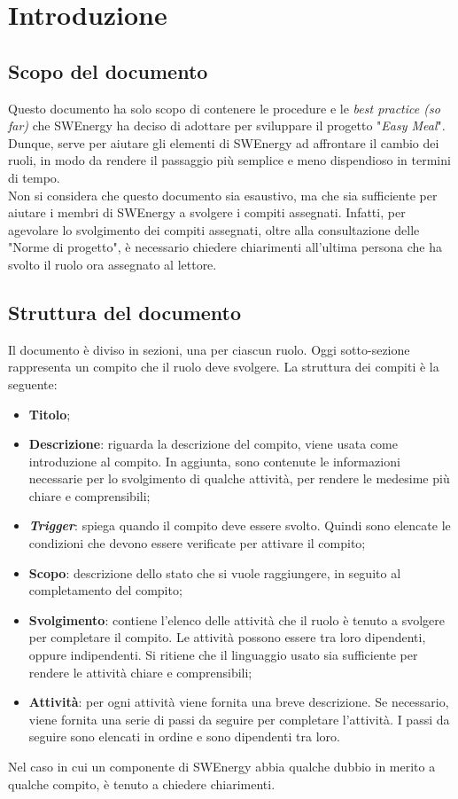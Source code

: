 \section{Introduzione}
\subsection{Scopo del documento}

Questo documento ha solo scopo di contenere le procedure e le \textit{best
	practice (so far)} che SWEnergy ha deciso di adottare per sviluppare il
progetto "\textit{Easy Meal}".
Dunque, serve per aiutare gli elementi di SWEnergy ad affrontare il cambio
dei ruoli, in modo da rendere il passaggio più semplice e meno dispendioso in
termini di tempo.\\
Non si considera che questo documento sia esaustivo, ma che sia sufficiente per
aiutare i membri di SWEnergy a svolgere i compiti assegnati. Infatti, per
agevolare lo svolgimento dei compiti assegnati, oltre alla consultazione delle
"Norme di progetto", è necessario chiedere chiarimenti all'ultima persona che ha
svolto il ruolo ora assegnato al lettore.


\subsection{Struttura del documento}

Il documento è diviso in sezioni, una per ciascun ruolo. Oggi sotto-sezione
rappresenta un compito che il ruolo deve svolgere. La struttura dei compiti è la
seguente:
\begin{itemize}
	\item \textbf{Titolo};

	\item \textbf{Descrizione}: riguarda la descrizione del compito, viene usata
	      come introduzione al compito. In aggiunta, sono contenute le
	      informazioni necessarie per lo svolgimento di qualche attività, per
	      rendere le medesime più chiare e comprensibili;

	\item \textbf{\textit{Trigger}}: spiega quando il compito deve essere
	      svolto. Quindi sono elencate le condizioni che devono essere
	      verificate per attivare il compito;

	\item \textbf{Scopo}: descrizione dello stato che si vuole raggiungere, in
	      seguito al completamento del compito;

	\item \textbf{Svolgimento}: contiene l'elenco delle attività che il ruolo è
	      tenuto a svolgere per completare il compito. Le attività possono
	      essere tra loro dipendenti, oppure indipendenti. Si ritiene che il
	      linguaggio usato sia sufficiente per rendere le attività chiare e
	      comprensibili;

	\item \textbf{Attività}: per ogni attività viene fornita una breve
	      descrizione. Se necessario, viene fornita una serie di passi da
	      seguire per completare l'attività. I passi da seguire sono elencati in
	      ordine e sono dipendenti tra loro.
\end{itemize}

Nel caso in cui un componente di SWEnergy abbia qualche dubbio in merito a
qualche compito, è tenuto a chiedere chiarimenti.
